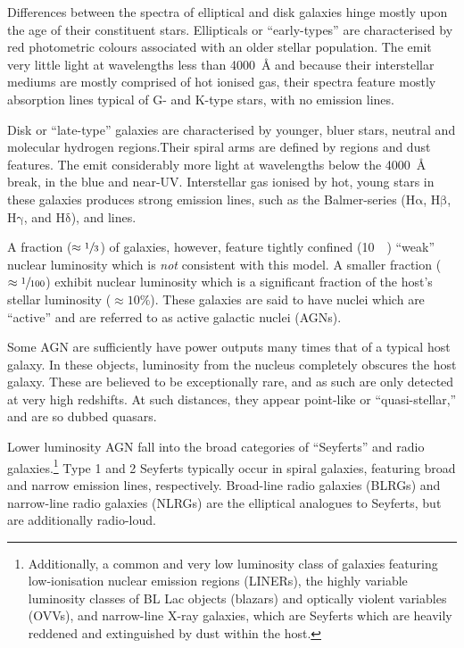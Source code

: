 \documentclass[a4paper,11pt]{article}
\begin{document}
Differences between the spectra of elliptical and disk galaxies hinge mostly upon the age of their constituent stars. Ellipticals or ``early-types'' are characterised by red photometric colours associated with an older stellar population. The emit very little light at wavelengths less than \SI{4000}{\angstrom} and because their interstellar mediums are mostly comprised of hot ionised gas, their spectra feature mostly absorption lines typical of G- and K-type stars, with no emission lines.\cite{Mo_2010}

Disk or ``late-type'' galaxies are characterised by younger, bluer stars, neutral  and molecular  hydrogen regions.Their spiral arms are defined by  regions and dust features. The emit considerably more light at wavelengths below the \SI{4000}{\angstrom} break, in the blue and near-UV. Interstellar gas ionised by hot, young stars in these galaxies produces strong emission lines, such as the Balmer-series ($\mathrm{H\alpha}$, $\mathrm{H\beta}$, $\mathrm{H\gamma}$, and $\mathrm{H\delta}$),  and  lines.\cite{Mo_2010}

A fraction ($\approx \sfrac{1}{3}$) of galaxies, however, feature tightly confined (\SI{10}{\kilo\parsec}) ``weak'' nuclear luminosity which is \textit{not} consistent with this model.\cite{McClure_2019} A smaller fraction ($\approx \sfrac{1}{100}$) exhibit nuclear luminosity which is a significant fraction of the host's stellar luminosity ($\approx 10\%$).\cite{Sparke_2000} These galaxies are said to have nuclei which are ``active'' and are referred to as active galactic nuclei (AGNs).\cite{McClure_2019}\cite{Peterson_1997}

Some AGN are sufficiently have power outputs many times that of a typical host galaxy. In these objects, luminosity from the nucleus completely obscures the host galaxy. These are believed to be exceptionally rare, and as such are only detected at very high redshifts. At such distances, they appear point-like or  ``quasi-stellar,'' and are so dubbed quasars.\cite{Peterson_1997}

Lower luminosity AGN fall into the broad categories of ``Seyferts'' and radio galaxies.\footnote{Additionally, a common and very low luminosity class of galaxies featuring low-ionisation nuclear emission regions (LINERs), the highly variable luminosity classes of BL Lac objects (blazars) and optically violent variables (OVVs), and narrow-line X-ray galaxies, which are Seyferts which are heavily reddened and extinguished by dust within the host.} Type 1 and 2 Seyferts typically occur in spiral galaxies, featuring broad and narrow emission lines, respectively. Broad-line radio galaxies (BLRGs) and narrow-line radio galaxies (NLRGs) are the elliptical analogues to Seyferts, but are additionally radio-loud.\cite{Peterson_1997}
\end{document}
